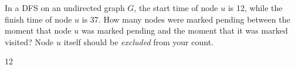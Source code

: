 \begin{prob}
    In a DFS on an undirected graph $G$, the start time of node $u$ is 12, while the
    finish time of node $u$ is 37. How many nodes were marked pending between the moment
    that node $u$ was marked pending and the moment that it was marked visited? Node
    $u$ itself should be \emph{excluded} from your count.

    \begin{soln}
        12
    \end{soln}

\end{prob}
